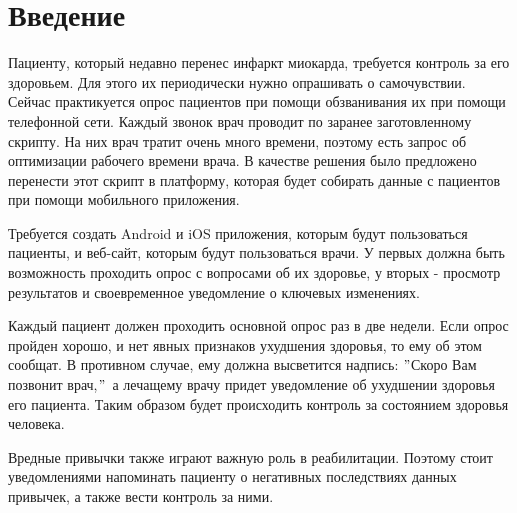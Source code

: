 \chapter*{Введение}
\label{sec:4}

Пациенту, который недавно перенес инфаркт миокарда, требуется контроль за его здоровьем.
Для этого их периодически нужно опрашивать о самочувствии.
Сейчас практикуется опрос пациентов при помощи обзванивания их при помощи телефонной сети.
Каждый звонок врач проводит по заранее заготовленному скрипту.
На них врач тратит очень много времени, поэтому есть запрос об оптимизации рабочего времени врача.
В качестве решения было предложено перенести этот скрипт в платформу, которая будет собирать данные с пациентов при помощи мобильного приложения.


Требуется создать Android и iOS приложения, которым будут пользоваться пациенты, и веб-сайт, которым будут пользоваться врачи.
У первых должна быть возможность проходить опрос с вопросами об их здоровье, у вторых - просмотр результатов и своевременное уведомление о ключевых изменениях.  \par
Каждый пациент должен проходить основной опрос раз в две недели.
Если опрос пройден хорошо, и нет явных признаков ухудшения здоровья, то ему об этом сообщат.
В противном случае, ему должна высветится надпись: \("\)Скоро Вам позвонит врач,\("\)\, а лечащему врачу придет уведомление об ухудшении здоровья его пациента.
Таким образом будет происходить контроль за состоянием здоровья человека. \par
Вредные привычки также играют важную роль в реабилитации.
Поэтому стоит уведомлениями напоминать пациенту о негативных последствиях данных привычек, а также вести контроль за ними.

